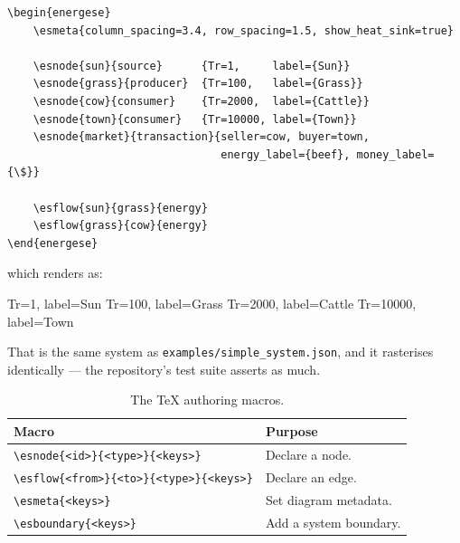 \documentclass{article}
\begin{document}
\begin{verbatim}
\begin{energese}
    \esmeta{column_spacing=3.4, row_spacing=1.5, show_heat_sink=true}

    \esnode{sun}{source}      {Tr=1,     label={Sun}}
    \esnode{grass}{producer}  {Tr=100,   label={Grass}}
    \esnode{cow}{consumer}    {Tr=2000,  label={Cattle}}
    \esnode{town}{consumer}   {Tr=10000, label={Town}}
    \esnode{market}{transaction}{seller=cow, buyer=town,
                                 energy_label={beef}, money_label={\$}}

    \esflow{sun}{grass}{energy}
    \esflow{grass}{cow}{energy}
\end{energese}
\end{verbatim}

\noindent which renders as:

\begin{center}
\begin{energese}

          {Tr=1,     label={Sun}}
      {Tr=100,   label={Grass}}
        {Tr=2000,  label={Cattle}}
       {Tr=10000, label={Town}}

\end{energese}
\end{center}

\noindent That is the same system as \texttt{examples/simple\_system.json}, and
it rasterises identically --- the repository's test suite asserts as much.

\begin{table}[H]
\centering
\begin{tabular}{ll}
\toprule
Macro & Purpose \\
\midrule
\verb|\esnode{<id>}{<type>}{<keys>}|         & Declare a node. \\
\verb|\esflow{<from>}{<to>}{<type>}{<keys>}| & Declare an edge. \\
\verb|\esmeta{<keys>}|                       & Set diagram metadata. \\
\verb|\esboundary{<keys>}|                   & Add a system boundary. \\
\bottomrule
\end{tabular}
\caption{The \TeX{} authoring macros.}
\end{table}
\end{document}
